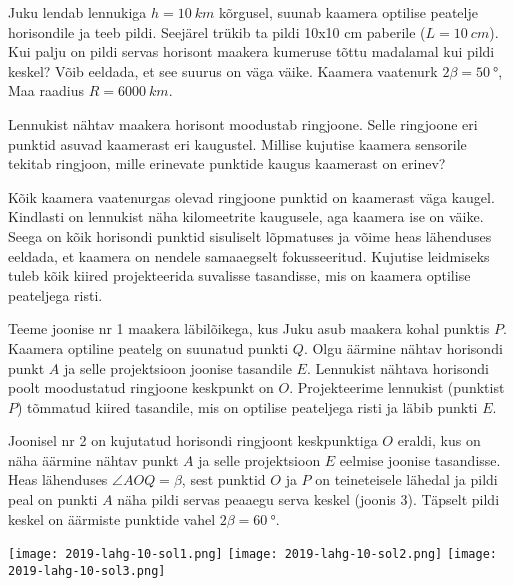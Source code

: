 
Juku lendab lennukiga $h=\SI{10}{km}$ kõrgusel, suunab kaamera optilise peatelje horisondile ja teeb pildi. Seejärel trükib ta pildi 10x10 cm paberile ($L=\SI{10}{cm}$). Kui palju on pildi servas horisont maakera kumeruse tõttu madalamal kui pildi keskel? Võib eeldada, et see suurus on väga väike. Kaamera vaatenurk $2\beta=\SI{50}{\degree}$, Maa raadius $R=\SI{6000}{km}$. 



\hint

\solu
Lennukist nähtav maakera horisont moodustab ringjoone. Selle ringjoone eri punktid asuvad kaamerast eri kaugustel. Millise kujutise kaamera sensorile tekitab ringjoon, mille erinevate punktide kaugus kaamerast on erinev?

Kõik kaamera vaatenurgas olevad ringjoone punktid on kaamerast väga kaugel. Kindlasti on lennukist näha kilomeetrite kaugusele, aga kaamera ise on väike. Seega on kõik horisondi punktid sisuliselt lõpmatuses ja võime heas lähenduses eeldada, et kaamera on nendele samaaegselt fokusseeritud. Kujutise leidmiseks tuleb kõik kiired projekteerida suvalisse tasandisse, mis on kaamera optilise peateljega risti.

Teeme joonise nr 1 maakera läbilõikega, kus Juku asub maakera kohal punktis $P$. Kaamera optiline peatelg on suunatud punkti $Q$. Olgu äärmine nähtav horisondi punkt $A$ ja selle projektsioon joonise tasandile $E$. Lennukist nähtava horisondi poolt moodustatud ringjoone keskpunkt on $O$. Projekteerime lennukist (punktist $P$) tõmmatud kiired tasandile, mis on optilise peateljega risti ja läbib punkti $E$.

Joonisel nr 2 on kujutatud horisondi ringjoont keskpunktiga $O$ eraldi, kus on näha äärmine nähtav punkt $A$ ja selle projektsioon $E$ eelmise joonise tasandisse. Heas lähenduses $\angle AOQ = \beta$, sest punktid $O$ ja $P$ on teineteisele lähedal ja pildi peal on punkti $A$ näha pildi servas peaaegu serva keskel (joonis 3). Täpselt pildi keskel on äärmiste punktide vahel $2\beta = \SI{60}{\degree}$.

\begin{center}
\texttt{[image: 2019-lahg-10-sol1.png]}
\texttt{[image: 2019-lahg-10-sol2.png]}
\texttt{[image: 2019-lahg-10-sol3.png]}
\end{center}

